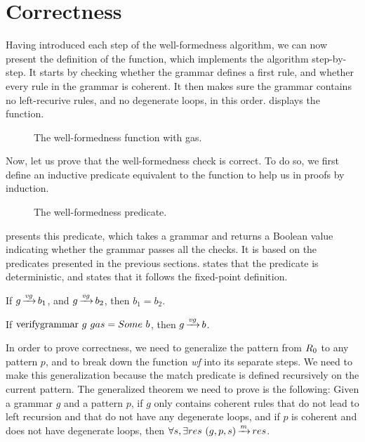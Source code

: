 \section{Correctness}

Having introduced each step of the well-formedness algorithm,
we can now present the definition of the \textit{\verifygrammarname{}} function,
which implements the algorithm step-by-step.
It starts by checking whether the grammar defines a first rule,
and whether every rule in the grammar is coherent.
It then makes sure the grammar contains no left-recurive rules,
and no degenerate loops, in this order.
 displays the function.
\begin{figure}
    \centering
    
    \caption{The well-formedness function with gas.}
    \label{fig:verifygrammar-function}
\end{figure}

Now, let us prove that the well-formedness check is correct.
To do so, we first define an
inductive predicate equivalent to
the \textit{\verifygrammarname{}} function
to help us in proofs by induction.
\begin{figure}
    \centering
    
    \caption{The well-formedness predicate.}
    \label{fig:verifygrammar}
\end{figure}
presents this predicate,
which takes a grammar
and returns a Boolean value
indicating whether the grammar
passes all the checks.
It is based on the predicates
presented in the previous sections.
states that the predicate is deterministic,
and 
states that it follows the fixed-point definition.

\begin{lemma}
    \label{lemma:verifygrammar-determinism}
    If $g \operatorname{\xrightarrow{\mathit{vg}}} b_1$,
    and $g \operatorname{\xrightarrow{\mathit{vg}}} b_2$,
    then $b_1 = b_2$.
\end{lemma}

\begin{lemma}
    \label{lemma:verifygrammar-follows}
    If $\text{verifygrammar{}}\ g\ gas = Some\ b$,
    then $g \operatorname{\xrightarrow{\mathit{vg}}} b$.
\end{lemma}

In order to prove correctness,
we need to generalize the pattern from $R_{0}$
to any pattern $p$,
and to break down the function \textit{wf}
into its separate steps.
We need to make this generalization
because the match predicate is defined
recursively on the current pattern.
The generalized theorem we need to prove is the following:
Given a grammar $g$ and a pattern $p$,
if $g$ only contains coherent rules
that do not lead to left recursion
and that do not have any degenerate loops,
and if $p$ is coherent
and does not have degenerate loops,
then ${\forall s, \exists res\ \Matches{g}{p}{s}{res}}$.

